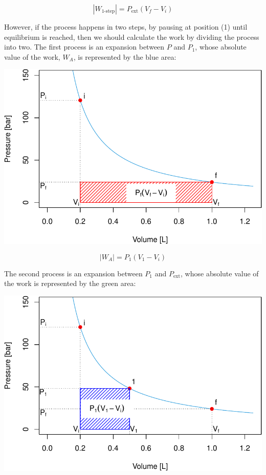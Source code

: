 \documentclass[
]{book}
\theoremstyle{definition}
\theoremstyle{definition}
\theoremstyle{definition}
\theoremstyle{remark}
\begin{document}
\begin{equation}
\left| W_{\text{1-step}} \right| = P_{\text{ext}} (V_f-V_i)
  \label{eq:Warea1}
\end{equation}

However, if the process happens in two steps, by pausing at position (1) until equilibrium is reached, then we should calculate the work by dividing the process into two. The first process is an expansion between \(P\) and \(P_1\), whose absolute value of the work, \(W_A\), is represented by the blue area:

\begin{center}\includegraphics{Pchem1_files/figure-latex/unnamed-chunk-3-1} \end{center}

\begin{equation}
\left| W_A \right| = P_1 (V_1-V_i)
  \label{eq:Warea2}
\end{equation}

The second process is an expansion between \(P_1\) and \(P_{\text{ext}}\), whose absolute value of the work is represented by the green area:

\begin{center}\includegraphics{Pchem1_files/figure-latex/unnamed-chunk-4-1} \end{center}
\end{document}
